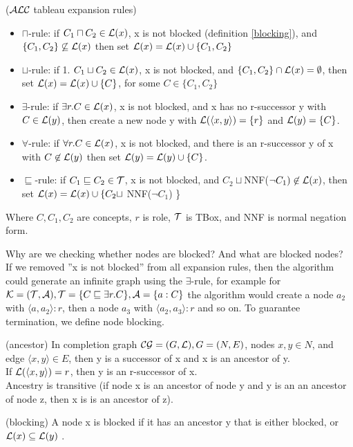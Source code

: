 \begin{mydef} \cite{handbook2} ($\mathcal{ALC}$ tableau expansion rules)
\begin{itemize}
\item $\sqcap$-rule: if 	 $C_1 \sqcap C_2 \in \mathcal{L} (x)$, x is not blocked (definition \ref{blocking}), and 
$\{C_1, C_2\} \not\subseteq  \mathcal{L} (x)$
then set $\mathcal{L} (x) = \mathcal{L} (x) \cup \{C_1, C_2\}$
\item $\sqcup$-rule: if 1. $C_1 \sqcup C_2 \in \mathcal{L} (x)$, x is not blocked, and 
$\{C_1, C_2\} \cap  \mathcal{L} (x) = \emptyset$,
then set $\mathcal{L} (x) = \mathcal{L} (x) \cup \{C\}$, for some $C \in \{C_1,C_2\}$
\item $\exists$-rule: if  $\exists r.C \in \mathcal{L} (x)$, x is not blocked, and
x has no r-successor y with $C \in \mathcal{L} (y)$,
then create a new node y with $\mathcal{L} (\langle x, y \rangle) = \{r\}$ and $\mathcal{L} (y) = \{C\}$.
\item $\forall$-rule: if $\forall r.C \in \mathcal{L} (x)$, x is not blocked, and
there is an r-successor y of x with $C \not\in \mathcal{L} (y)$
then set $\mathcal{L}(y) = \mathcal{L}(y) \cup \{C\}$.
\item $\sqsubseteq$-rule: if  $C_1 \sqsubseteq C_2 \in \mathcal{T} $, x is not blocked, and
$C_2 \sqcup $NNF($\neg C_1) \not\in \mathcal{L} (x)$,
then set $\mathcal{L} (x) = \mathcal{L} (x) \cup \{C_2 \sqcup$ NNF($\neg C_1$) \} 
\end{itemize}
Where $C, C_1, C_2$ are concepts, $r$ is role, $\mathcal{T}$ is TBox, and NNF is normal negation form.
\end{mydef}

Why are we checking whether nodes are blocked? And what are blocked nodes? \\
If we removed ''x is not blocked'' from all expansion rules, then the algorithm could generate an infinite graph using the $\exists$-rule, for example for 
$\mathcal{K} =(\mathcal{T} ,\mathcal{A}), \mathcal{T} = \{C \sqsubseteq \exists r.C \}, \mathcal{A}=\{a:C\}$ the algorithm would create a node $a_2$ with $\langle a,a_2 \rangle :r$, then a node $a_3$ with $\langle a_2,a_3\rangle :r$ and so on.
To guarantee termination, we define node blocking.
\begin{mydef} \label{ancestor} (ancestor)
In completion graph $\mathcal{CG} = (G, \mathcal{L}), G=(N,E)$, nodes $x,y \in N$, and edge $\langle x,y \rangle \in E$, then y is a successor of x and x is an ancestor of y. \\
If $\mathcal{L} (\langle x,y \rangle) = r$, then y is an r-successor of x. \\
Ancestry is transitive (if node x is an ancestor of node y and y is an an ancestor of node z, then x is is an ancestor of z).

\end{mydef}
\begin{mydef} \label{blocking}(blocking)
A node x is blocked if it has an ancestor y that is either blocked, or $\mathcal{L} (x) \subseteq \mathcal{L} (y)$ .
\end{mydef}

